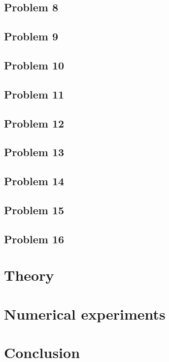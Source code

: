 \documentclass[11pt,a4paper,twoside,norsk]{article}
\begin{document}
\subsection*{Problem 8}


\subsection*{Problem 9}
 

\subsection*{Problem 10}


\subsection*{Problem 11}


\subsection*{Problem 12}


\subsection*{Problem 13}


\subsection*{Problem 14}


\subsection*{Problem 15}


\subsection*{Problem 16}


\section{Theory}
\label{sec:theory}


\section{Numerical experiments}
\label{sec:numexp}


\section{Conclusion}
\label{sec:conclusion}



 
\end{document}
